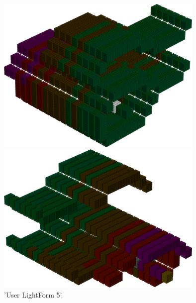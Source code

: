 %
\begin{minipage}[b]{0.48\linewidth}
\begin{figure}[H]
    \centering
    \begin{adjustbox}{width=5cm,margin=0cm 0cm}
      \includegraphics[width=10cm]{src/colorspace_patterns/pattern13-45.png}%
    \end{adjustbox}
    \begin{adjustbox}{width=5cm,margin=0cm 0cm}
      \includegraphics[width=10cm]{src/colorspace_patterns/pattern13-225.png}%
    \end{adjustbox}
\caption{'User LightForm 5'.}
\end{figure}
\end{minipage}
